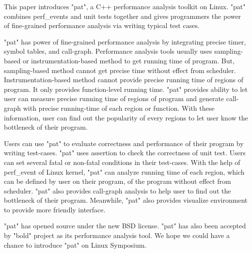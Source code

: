 This paper introduces "pat", a C++ performance analysis toolkit on Linux.
"pat" combines perf_events and unit tests together and gives programmers the power of fine-grained performance analysis via writing typical test cases.

"pat" has power of fine-grained performance analysis by integrating precise timer, symbol tables, and call-graph.
Performance analysis tools usually uses sampling-based or instrumentation-based method to get running time of program.
But, sampling-based method cannot get precise time without effect from scheduler.
Instrumentation-based method cannot provide precise running time of regions of program. It only provides function-level running time. 
"pat" provides ability to let user can measure precise running time of regions of program and generate call-graph with precise running-time of each region or function. 
With these information, user can find out the popularity of every regions to let user know the bottleneck of their program.

Users can use "pat" to evaluate correctness and performance of their program by writing test-cases.
"pat" uses assertion to check the correctness of unit test. 
Users can set several fatal or non-fatal conditions in their test-cases.
With the help of perf_event of Linux kernel, "pat" can analyze running time of each region, which can be defined by user on their program, of the program without effect from scheduler. 
"pat" also provides call-graph analysis to help user to find out the bottleneck of their program. 
Meanwhile, "pat" also provides visualize environment to provide more friendly interface.

"pat" has opened source under the new BSD license. 
"pat" has also been accepted by "bold" project as its performance analysis tool.
We hope we could have a chance to introduce "pat" on Linux Symposium.
